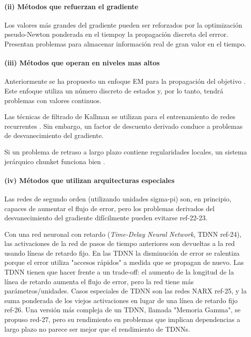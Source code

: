 \paragraph{(ii) Métodos que refuerzan el gradiente} Los valores más grandes del gradiente pueden ser reforzados por la optimización pseudo-Newton ponderada en el tiempoy la propagación discreta del errror. Presentan problemas para almacenar información real de gran valor en el tiempo.

\paragraph{(iii) Métodos que operan en niveles mas altos} Anteriormente se ha propuesto un enfoque EM para la propagación del objetivo \cite{Bengio1993}. Este enfoque utiliza un número discreto de estados y, por lo tanto, tendrá problemas con valores continuos.

Las técnicas de filtrado de Kallman se utilizan para el entrenamiento de redes recurrentes \cite{Puskorius1994}. Sin embargo, un factor de descuento derivado conduce a problemas de desvanecimiento del gradiente.

Si un problema de retraso a largo plazo contiene regularidades locales, un sistema jerárquico chunket funciona bien \cite{Schmidhuber1992a}.

\paragraph{(iv) Métodos que utilizan arquitecturas especiales} Las redes de segundo orden (utilizando unidades sigma-pi) son, en principio, capaces de aumentar el flujo de error, pero los problemas derivados del desvanecimiento del gradiente difícilmente pueden evitarse ref-22-23.

Con una red neuronal con retardo ({\em Time-Delay Neural Network}, TDNN ref-24), las activaciones de la red de pasos de tiempo anteriores son devueltas a la red usando líneas de retardo fijo. En las TDNN la disminución de error se ralentiza porque el error utiliza "accesos rápidos" a medida que se propagan de nuevo. Las TDNN tienen que hacer frente a un trade-off: el aumento de la longitud de la línea de retardo aumenta el flujo de error, pero la red tiene más parámetros/unidades. Casos especiales de TDNN son las redes NARX ref-25, y la suma ponderada de los viejos activaciones en lugar de una línea de retardo fijo ref-26. Una versión más compleja de un TDNN, llamada "Memoria Gamma", se propuso red-27, pero su rendimiento en problemas que implican dependencias a largo plazo no parece ser mejor que el rendimiento de TDNNs.

